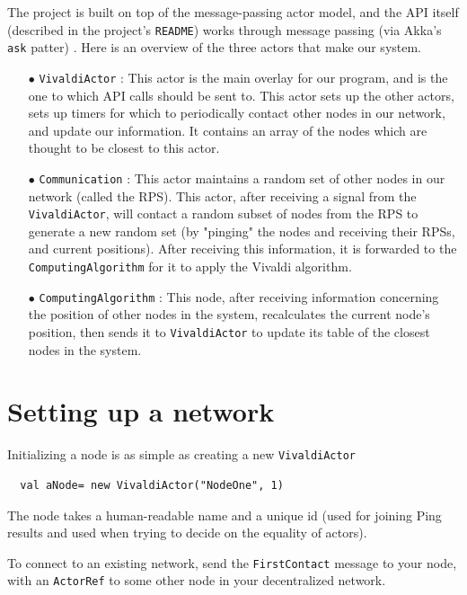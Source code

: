 \documentclass[11pt,a4paper]{article}
\begin{document}
The project is built on top of the message-passing actor model, and the API itself (described in the project's \verb|README|) works through message passing (via Akka's \verb|ask| patter) . Here is an overview of the three actors that make our system. 
\begin{itemize}
	\item[$\bullet$] \verb|VivaldiActor| : This actor is the main overlay for our program, and is the one to which API calls should be sent to. This actor sets up the other actors, sets up timers for which to periodically contact other nodes in our network, and update our information. It contains an array of the nodes which are thought to be closest to this actor.
	
	\item[$\bullet$] \verb|Communication| : 
	   This actor maintains a random set of other nodes in our network (called the RPS). This actor, after receiving a signal from the \verb|VivaldiActor|, will contact a random subset of nodes from the RPS to generate a new random set (by "pinging" the nodes and receiving their RPSs, and current positions). After receiving this information, it is forwarded to the \verb|ComputingAlgorithm| for it to apply the Vivaldi algorithm.
		
	\item[$\bullet$] \verb|ComputingAlgorithm| : This node, after receiving information concerning the position of other nodes in the system, recalculates the current node's position, then sends it to \verb|VivaldiActor| to update its table of the closest nodes in the system.
\end{itemize}


\section{Setting up a network}

 Initializing a node is as simple as creating a new \verb|VivaldiActor|
 \begin{lstlisting}
  val aNode= new VivaldiActor("NodeOne", 1)
 \end{lstlisting}
 
 The node takes a human-readable name and a unique id (used for joining Ping results and used when trying to decide on the equality of actors). 
 
 To connect to an existing network, send the \verb|FirstContact| message to your node, with an \verb|ActorRef| to some other node in your decentralized network.
 
\end{document}
